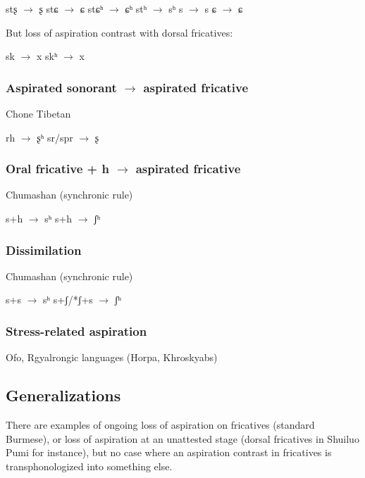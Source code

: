 \documentclass[oldfontcommands,oneside,a4paper,11pt]{article}
\begin{document}
\begin{exe}
\ex 
\glt *stʂ $\rightarrow$ ʂ
\glt *stɕ  $\rightarrow$ ɕ
\glt *stɕʰ $\rightarrow$ ɕʰ
\glt *stʰ $\rightarrow$ sʰ
\glt *s $\rightarrow$ s
\glt *ɕ $\rightarrow$ ɕ
\end{exe}

But loss of aspiration contrast with dorsal fricatives:

\begin{exe}
\ex 
\glt *sk $\rightarrow$ x
\glt *skʰ $\rightarrow$ x
\end{exe}
\subsubsection{Aspirated sonorant $\rightarrow$ aspirated fricative}
Chone Tibetan
\begin{exe}
\ex 
\glt *rh $\rightarrow$ ʂʰ
\glt *sr/spr $\rightarrow$ ʂ
\end{exe}
\subsubsection{Oral fricative + h $\rightarrow$ aspirated fricative}

Chumashan (synchronic rule)

\begin{exe}
\ex 
\glt *s+h $\rightarrow$ sʰ
\glt *s+h $\rightarrow$ ʃʰ
\end{exe}
\subsubsection{Dissimilation}
Chumashan (synchronic rule)
\begin{exe}
\ex 
\glt *s+s $\rightarrow$ sʰ
\glt *s+ʃ/*ʃ+s $\rightarrow$ ʃʰ
\end{exe}

\subsubsection{Stress-related aspiration}
Ofo, Rgyalrongic languages (Horpa, Khroskyabs)

\subsection{Generalizations}
 

There are examples of ongoing loss of aspiration on fricatives (standard Burmese), or loss of aspiration at an unattested stage (dorsal fricatives in Shuiluo Pumi for instance), but no case where an aspiration contrast in fricatives is transphonologized into something else.
\end{document}
